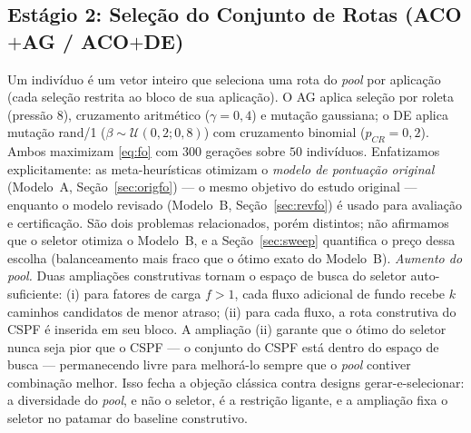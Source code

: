 \documentclass[journal]{IEEEtran}
\begin{document}
\subsection{Estágio 2: Seleção do Conjunto de Rotas (ACO$+$AG / ACO$+$DE)}
Um indivíduo é um vetor inteiro que seleciona uma rota do \emph{pool} por
aplicação (cada seleção restrita ao bloco de sua aplicação). O AG aplica
seleção por roleta (pressão 8), cruzamento aritmético ($\gamma{=}0{,}4$) e
mutação gaussiana; o DE aplica mutação rand/1
($\beta\sim\mathcal{U}(0{,}2;0{,}8)$) com cruzamento binomial
($p_{CR}{=}0{,}2$). Ambos maximizam \eqref{eq:fo} com $300$ gerações sobre
$50$ indivíduos.
Enfatizamos explicitamente: as meta-heurísticas otimizam o \emph{modelo de
pontuação original} (Modelo~A, Seção~\ref{sec:origfo}) --- o mesmo objetivo
do estudo original --- enquanto o modelo revisado (Modelo~B,
Seção~\ref{sec:revfo}) é usado para avaliação e certificação. São dois
problemas relacionados, porém distintos; não afirmamos que o seletor
otimiza o Modelo~B, e a Seção~\ref{sec:sweep} quantifica o preço dessa
escolha (balanceamento mais fraco que o ótimo exato do Modelo~B).
\emph{Aumento do pool.} Duas ampliações construtivas tornam o espaço de
busca do seletor auto-suficiente: (i) para fatores de carga $f>1$, cada
fluxo adicional de fundo recebe $k$ caminhos candidatos de menor atraso;
(ii) para cada fluxo, a rota construtiva do CSPF é inserida em seu bloco. A
ampliação (ii) garante que o ótimo do seletor nunca seja pior que o CSPF ---
o conjunto do CSPF está dentro do espaço de busca --- permanecendo livre
para melhorá-lo sempre que o \emph{pool} contiver combinação melhor. Isso
fecha a objeção clássica contra designs gerar-e-selecionar: a diversidade do
\emph{pool}, e não o seletor, é a restrição ligante, e a ampliação fixa o
seletor no patamar do baseline construtivo.
\end{document}
